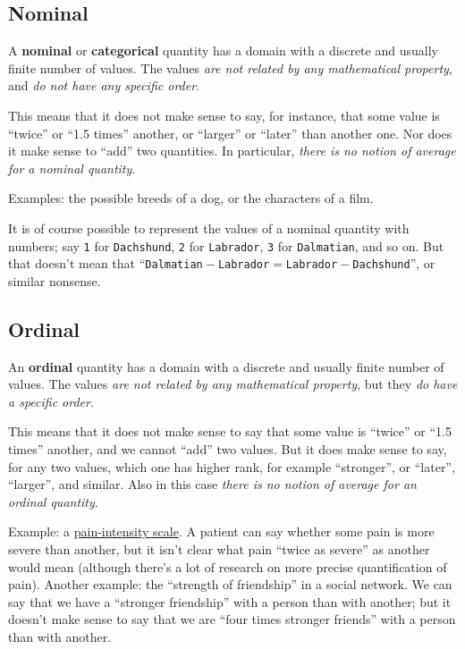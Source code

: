 \documentclass[
  a4paper,
  DIV=11,
  numbers=noendperiod,
  oneside]{scrreprt}
\begin{document}
\hypertarget{nominal}{%
\subsection{Nominal}\label{nominal}}

A {\textbf{nominal}} or {\textbf{categorical}} quantity has a domain
with a discrete and usually finite number of values. The values
{\emph{are not related by any mathematical property}}, and {\emph{do not
have any specific order}}.

This means that it does not make sense to say, for instance, that some
value is ``twice'' or ``1.5 times'' another, or ``larger'' or ``later''
than another one. Nor does it make sense to ``add'' two quantities. In
particular, {\emph{there is no notion of average for a nominal
quantity}}.

Examples: the possible breeds of a dog, or the characters of a film.

It is of course possible to represent the values of a nominal quantity
with numbers; say \texttt{1} for \texttt{Dachshund}, \texttt{2} for
\texttt{Labrador}, \texttt{3} for \texttt{Dalmatian}, and so on. But
that doesn't mean that
``\texttt{Dalmatian}\({}-{}\)\texttt{Labrador}\({}={}\)\texttt{Labrador}\({}-{}\)\texttt{Dachshund}'',
or similar nonsense.

\hypertarget{ordinal}{%
\subsection{Ordinal}\label{ordinal}}

An {\textbf{ordinal}} quantity has a domain with a discrete and usually
finite number of values. The values {\emph{are not related by any
mathematical property}}, but they {\emph{do have a specific order}}.

This means that it does not make sense to say that some value is
``twice'' or ``1.5 times'' another, and we cannot ``add'' two values.
But it does make sense to say, for any two values, which one has higher
rank, for example ``stronger'', or ``later'', ``larger'', and similar.
Also in this case {\emph{there is no notion of average for an ordinal
quantity}}.

Example: a
\href{https://doi.org/10.1016/j.jpainsymman.2004.08.007}{pain-intensity
scale}. A patient can say whether some pain is more severe than another,
but it isn't clear what pain ``twice as severe'' as another would mean
(although there's a lot of research on more precise quantification of
pain). Another example: the ``strength of friendship'' in a social
network. We can say that we have a ``stronger friendship'' with a person
than with another; but it doesn't make sense to say that we are ``four
times stronger friends'' with a person than with another.
\end{document}
